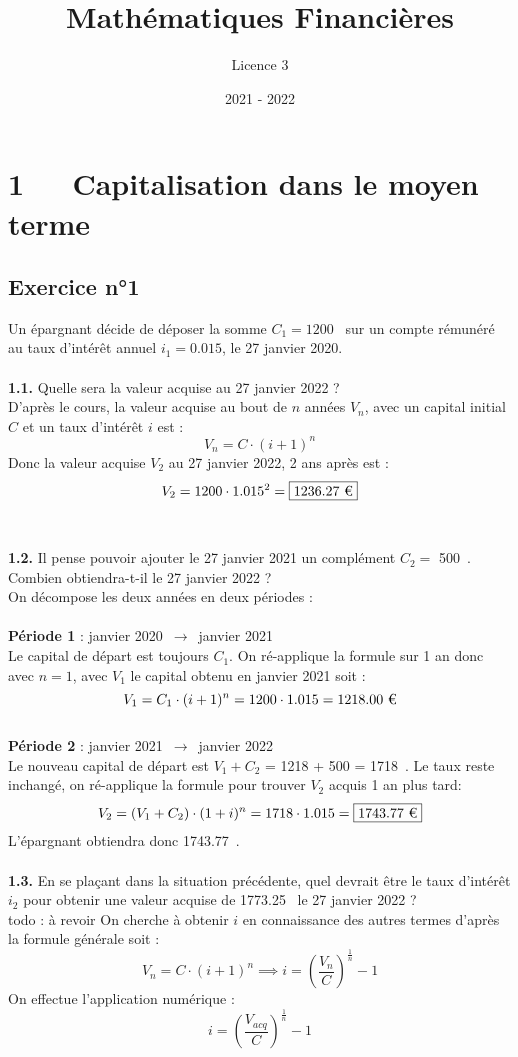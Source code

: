 \documentclass{article}
\title{Mathématiques Financières}
\author{Licence 3}
\date{2021 - 2022}
\begin{document}
\normalsize
\maketitle

\renewcommand*\contentsname{Table des matières}
\newpage

\section{1   Capitalisation dans le moyen terme}
\subsection{Exercice n°1}
\textcolor{exogris}{
Un épargnant décide de déposer la somme $C_1 = 1200$ \texteuro sur un compte rémunéré au taux d’intérêt annuel $i_1 = 0.015$, le 27 janvier 2020.
}
\\\\ \textcolor{exogris}{\textbf{1.1.}
Quelle sera la valeur acquise au 27 janvier 2022 ?
}
\\%
D'après le cours, la valeur acquise au bout de $n$ années $V_n$, avec un capital initial $C$ et un taux d'intérêt $i$ est :
$$V_n = C\cdot(i+1)^n$$
Donc la valeur acquise $V_2$ au 27 janvier 2022, 2 ans après est :
$$V_2 = 1200 \cdot 1.015^2 = \boxed{1236.27 \text{ \texteuro}}$$
\\%
\\%
\textcolor{exogris}{\textbf{1.2.}
Il pense pouvoir ajouter le 27 janvier 2021 un complément $C_2 =$ 500 \texteuro. Combien obtiendra-t-il le 27 janvier 2022 ?
}
\\%
On décompose les deux années en deux périodes :
\\\\\textbf{Période 1} : janvier 2020 $\rightarrow$ janvier 2021
\\Le capital de départ est toujours $C_1$. On ré-applique la formule sur 1 an donc avec $n=1$, avec $V_1$ le capital obtenu en janvier 2021 soit :
$$V_1 = C_1 \cdot (i+1)^n = 1200 \cdot 1.015 = 1218.00 \text{ \texteuro}$$
\\\textbf{Période 2} : janvier 2021 $\rightarrow$ janvier 2022
\\Le nouveau capital de départ est $V_1 + C_2$ = 1218 + 500 = 1718 \texteuro.
Le taux reste inchangé, on ré-applique la formule pour trouver $V_2$ acquis 1 an plus tard:
$$V_2 = (V_1 + C_2) \cdot (1+i)^n = 1718 \cdot 1.015 = \boxed{1743.77 \text{ \texteuro}}$$
L'épargnant obtiendra donc 1743.77 \texteuro.
\\%
\\%
\textcolor{exogris}{\textbf{1.3.}
En se plaçant dans la situation précédente, quel devrait être le taux d’intérêt $i_2$ pour obtenir une valeur
acquise de 1773.25 \texteuro le 27 janvier 2022 ?
}%
\\%
todo : à revoir
On cherche à obtenir $i$ en connaissance des autres termes d'après la formule générale soit :
$$V_n = C\cdot(i+1)^n \implies \boxed{i = \left(\dfrac{V_n}{C}\right)^{\frac{1}{n}}-1}$$
On effectue l'application numérique :
$$i = \left(\dfrac{V_{acq}}{C}\right)^{\frac{1}{n}}-1$$
\end{document}
